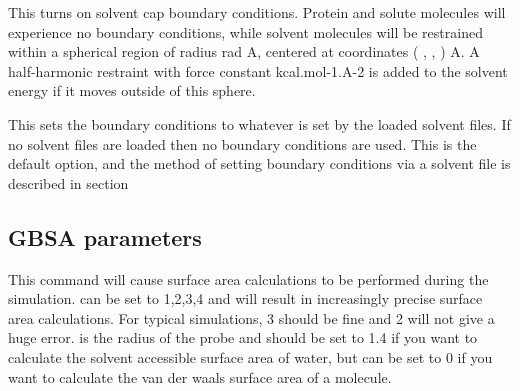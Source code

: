 \documentclass[letterpaper,10pt,english]{sphinxmanual}
\begin{document}
%
\begin{sphinxVerbatim}[commandchars=\\\{\}]
      
\end{sphinxVerbatim}

This turns on solvent cap boundary conditions. Protein and solute molecules will experience no boundary conditions, while solvent molecules will be restrained within a spherical region of radius rad A, centered at coordinates ( ,  , ) A. A half-harmonic restraint with force constant  kcal.mol-1.A-2 is added to the solvent energy if it moves outside of this sphere.

%
\begin{sphinxVerbatim}[commandchars=\\\{\}]
 
\end{sphinxVerbatim}

This sets the boundary conditions to whatever is set by the loaded solvent files. If no solvent files are loaded then no boundary conditions are used. This is the default option, and the method of setting boundary conditions via a solvent file is described in section {\hyperref[\detokenize{protoms:solventpdb}]{}}


\subsection{GBSA parameters}
\label{\detokenize{protoms:gbsa-parameters}}
\ignorespaces 
\def\sphinxLiteralBlockLabel{\label{\detokenize{protoms:index-42}}}
%
\begin{sphinxVerbatim}[commandchars=\\\{\}]
    
\end{sphinxVerbatim}

This command will cause surface area calculations to be performed during the simulation.  can be set to 1,2,3,4 and will result in increasingly precise surface area calculations. For typical simulations, 3 should be fine and 2 will not give a huge error.  is the radius of the probe and should be set to 1.4 if you want to calculate the solvent accessible surface area of water, but can be set to 0 if you want to calculate the van der waals surface area of a molecule.
\end{document}
